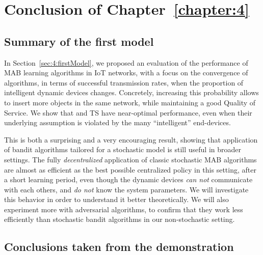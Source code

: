 



\section{Conclusion of Chapter~\ref{chapter:4}}
\label{sec:4:conclusion}


\subsection{Summary of the first model}\label{sub:41:conclusion}

In Section~\ref{sec:4:firstModel}, we proposed an evaluation of the performance of MAB learning algorithms in IoT networks,
with a focus on the convergence of algorithms, in terms of successful transmission rates, when the proportion of intelligent dynamic devices changes.
Concretely, increasing this probability allows to insert more objects in the same network, while maintaining a good Quality of Service.
We show that \UCB{} and TS have near-optimal performance, even when their underlying \iid{} assumption is violated by the many ``intelligent'' end-devices.

This is both a surprising and a very encouraging result, showing that application of bandit algorithms tailored for a stochastic model is still useful in broader settings.
The fully \emph{decentralized} application of classic stochastic MAB algorithms are almost as efficient as the best possible centralized policy in this setting, after a short learning period, even though the dynamic devices \emph{can not} communicate with each others, and \emph{do not} know the system parameters.
We will investigate this behavior in order to understand it better theoretically.
We will also experiment more with adversarial algorithms, to confirm that they work less efficiently than stochastic bandit algorithms in our non-stochastic setting.


\subsection{Conclusions taken from the demonstration}
\label{sec:42:conclusionFromDemonstration}


